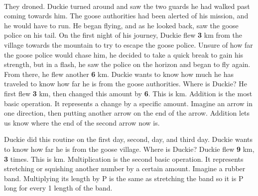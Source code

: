 \paragraph{} They droned. Duckie turned around and saw the two guards he had walked past coming towards him. The goose authorities had been alerted of his mission, and he would have to run. He began flying, and as he looked back, saw the goose police on his tail. 
\vfill
\pagebreak
{On the first night of his journey, Duckie flew \textbf{3} km from the village towards the mountain to try to escape the goose police. Unsure of how far the goose police would chase him, he decided to take a quick break to gain his strength, but in a flash, he saw the police on the horizon and began to fly again. From there, he flew another \textbf{6} km. Duckie wants to know how much he has traveled to know how far he is from the goose authorities. Where is Duckie?}
{He first flew \textbf{3} km, then changed this amount by \textbf{6}. This is  km.}
{Addition is the most basic operation. It represents a change by a specific amount. Imagine an arrow in one direction, then putting another arrow on the end of the arrow. Addition lets us know where the end of the second arrow now is.}
{}
{Duckie did this routine on the first day, second, day, and third day.  Duckie wants to know how far he is from the goose village. Where is Duckie?}
{Duckie flew \textbf{9} km, \textbf{3} times. This is  km.}
{Multiplication is the second basic operation. It represents stretching or squishing another number by a certain amount. Imagine a rubber band. Multiplying its length by P is the same as stretching the band so it is P long for every 1 length of the band.}
